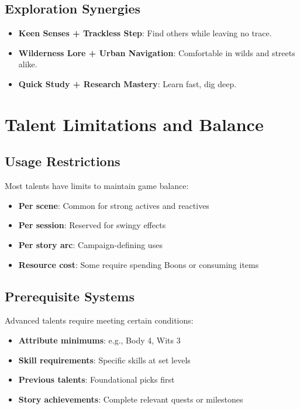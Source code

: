 \subsection*{Exploration Synergies}
\begin{itemize}
\item \textbf{Keen Senses + Trackless Step}: Find others while leaving no trace.
\item \textbf{Wilderness Lore + Urban Navigation}: Comfortable in wilds and streets alike.
\item \textbf{Quick Study + Research Mastery}: Learn fast, dig deep.
\end{itemize}

\section{Talent Limitations and Balance}

\subsection*{Usage Restrictions}
Most talents have limits to maintain game balance:
\begin{itemize}
\item \textbf{Per scene}: Common for strong actives and reactives
\item \textbf{Per session}: Reserved for swingy effects
\item \textbf{Per story arc}: Campaign-defining uses
\item \textbf{Resource cost}: Some require spending Boons or consuming items
\end{itemize}

\subsection*{Prerequisite Systems}
Advanced talents require meeting certain conditions:
\begin{itemize}
\item \textbf{Attribute minimums}: e.g., Body 4, Wits 3
\item \textbf{Skill requirements}: Specific skills at set levels
\item \textbf{Previous talents}: Foundational picks first
\item \textbf{Story achievements}: Complete relevant quests or milestones
\end{itemize}

